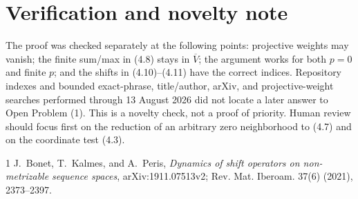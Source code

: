 \documentclass[11pt]{article}
\theoremstyle{remark}
\newcommand{\cV}{\overline V}
\begin{document}
\section{Verification and novelty note}

The proof was checked separately at the following points: projective weights
may vanish; the finite sum/max in (4.8) stays in $\cV$; the argument works
for both $p=0$ and finite $p$; and the shifts in (4.10)--(4.11) have the
correct indices.  Repository indexes and bounded exact-phrase,
title/author, arXiv, and projective-weight searches performed through
13 August 2026 did not locate a later answer to Open Problem (1).  This is a
novelty check, not a proof of priority.  Human review should focus first on
the reduction of an arbitrary zero neighborhood to (4.7) and on the
coordinate test (4.3).

\begin{thebibliography}{1}
J.~Bonet, T.~Kalmes, and A.~Peris,
\emph{Dynamics of shift operators on non-metrizable sequence spaces},
arXiv:1911.07513v2; Rev. Mat. Iberoam. 37(6) (2021), 2373--2397.
\end{thebibliography}
\end{document}
